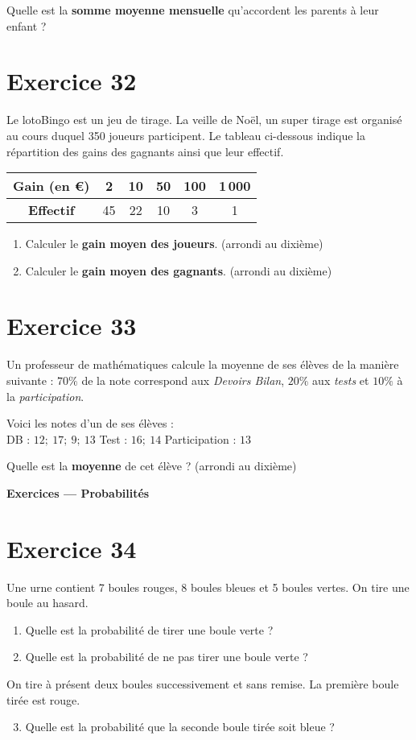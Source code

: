 \documentclass[a4paper,11pt]{article}
\begin{document}
\medskip
Quelle est la \textbf{somme moyenne mensuelle} qu’accordent les parents à leur enfant ?

\section*{Exercice 32}
Le loto\textendash Bingo est un jeu de tirage. La veille de Noël, un super tirage est organisé au cours duquel 350 joueurs participent. Le tableau ci-dessous indique la répartition des gains des gagnants ainsi que leur effectif.

\medskip
\renewcommand{\arraystretch}{1.25}
\begin{tabular}{|c|c|c|c|c|c|}
\hline
\textbf{Gain (en \euro)} & 2 & 10 & 50 & 100 & 1\,000\\
\hline
\textbf{Effectif} & 45 & 22 & 10 & 3 & 1\\
\hline
\end{tabular}

\medskip
\begin{enumerate}
  \item Calculer le \textbf{gain moyen des joueurs}. (arrondi au dixième)
  \item Calculer le \textbf{gain moyen des gagnants}. (arrondi au dixième)
\end{enumerate}


\section*{Exercice 33}
Un professeur de mathématiques calcule la moyenne de ses élèves de la manière suivante : \(70\%\) de la note correspond aux \textit{Devoirs Bilan}, \(20\%\) aux \textit{tests} et \(10\%\) à la \textit{participation}.

Voici les notes d’un de ses élèves :\\
\quad DB : \(12;\ 17;\ 9;\ 13\) \qquad
Test : \(16;\ 14\) \qquad
Participation : \(13\)

\medskip
Quelle est la \textbf{moyenne} de cet élève ? (arrondi au dixième)

\bigskip
{\Large \textbf{Exercices — Probabilités}}\par\medskip


\section*{Exercice 34}
Une urne contient 7 boules rouges, 8 boules bleues et 5 boules vertes. On tire une boule au hasard.
\begin{enumerate}
  \item Quelle est la probabilité de tirer une boule verte ?
  \item Quelle est la probabilité de ne pas tirer une boule verte ?
\end{enumerate}
On tire à présent deux boules successivement et sans remise. La première boule tirée est rouge.
\begin{enumerate}\setcounter{enumi}{2}
  \item Quelle est la probabilité que la seconde boule tirée soit bleue ?
\end{enumerate}
\end{document}
